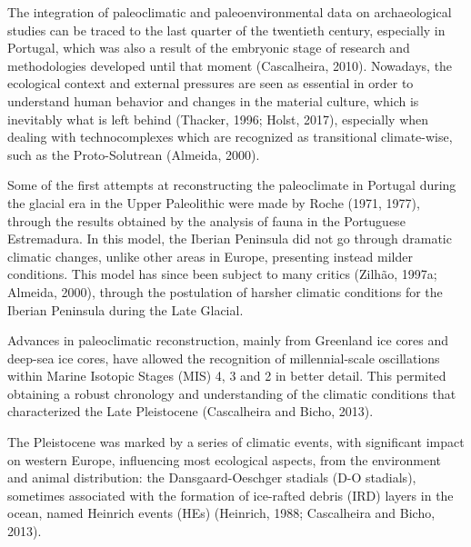 \documentclass[12pt,twoside]{reedthesis}
\begin{document}
The integration of paleoclimatic and paleoenvironmental data on archaeological studies can be traced to the last quarter of the twentieth century, especially in Portugal, which was also a result of the embryonic stage of research and methodologies developed until that moment (Cascalheira, 2010). Nowadays, the ecological context and external pressures are seen as essential in order to understand human behavior and changes in the material culture, which is inevitably what is left behind (Thacker, 1996; Holst, 2017), especially when dealing with technocomplexes which are recognized as transitional climate-wise, such as the Proto-Solutrean (Almeida, 2000).

Some of the first attempts at reconstructing the paleoclimate in Portugal during the glacial era in the Upper Paleolithic were made by Roche (1971, 1977), through the results obtained by the analysis of fauna in the Portuguese Estremadura. In this model, the Iberian Peninsula did not go through dramatic climatic changes, unlike other areas in Europe, presenting instead milder conditions. This model has since been subject to many critics (Zilhão, 1997a; Almeida, 2000), through the postulation of harsher climatic conditions for the Iberian Peninsula during the Late Glacial.

Advances in paleoclimatic reconstruction, mainly from Greenland ice cores and deep-sea ice cores, have allowed the recognition of millennial-scale oscillations within Marine Isotopic Stages (MIS) 4, 3 and 2 in better detail. This permited obtaining a robust chronology and understanding of the climatic conditions that characterized the Late Pleistocene (Cascalheira and Bicho, 2013).

The Pleistocene was marked by a series of climatic events, with significant impact on western Europe, influencing most ecological aspects, from the environment and animal distribution: the Dansgaard-Oeschger stadials (D-O stadials), sometimes associated with the formation of ice-rafted debris (IRD) layers in the ocean, named Heinrich events (HEs) (Heinrich, 1988; Cascalheira and Bicho, 2013).
\end{document}
